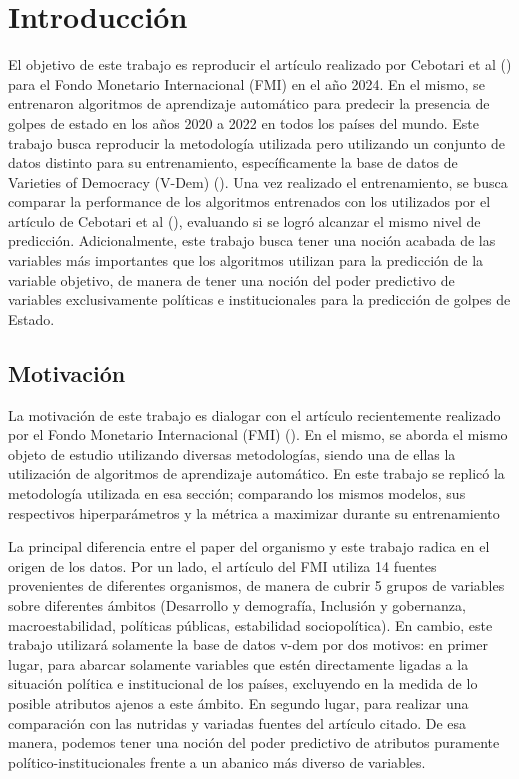 \documentclass{article}
\begin{document}

\pagebreak
\tableofcontents
\pagebreak

\section{Introducción}
El objetivo de este trabajo es reproducir el artículo realizado por Cebotari et al 
(\cite{Ceb24}) para el Fondo Monetario Internacional (FMI) en el año 2024. En el mismo,
se entrenaron algoritmos de aprendizaje automático para predecir la presencia de golpes
de estado en los años 2020 a 2022 en todos los países del mundo. Este trabajo busca
reproducir la metodología utilizada pero utilizando un conjunto de datos distinto para su
entrenamiento, específicamente la base de datos de Varieties of Democracy (V-Dem) 
(\cite{Cop24}). Una vez realizado el entrenamiento, se 
busca comparar la performance de los algoritmos entrenados con los utilizados por el artículo
de Cebotari et al (\cite{Ceb24}), evaluando si se logró alcanzar el mismo nivel de predicción. 
Adicionalmente, este trabajo busca tener una noción acabada de las variables más importantes 
que los algoritmos utilizan para la predicción de la variable objetivo, de manera de tener
una noción del poder predictivo de variables exclusivamente políticas e institucionales para 
la predicción de golpes de Estado.

\subsection{Motivación}
La motivación de este trabajo es dialogar con el artículo recientemente realizado por el 
Fondo Monetario Internacional (FMI) (\cite{Ceb24}). En el mismo, se aborda el mismo objeto 
de estudio utilizando diversas metodologías, siendo una de ellas la utilización de 
algoritmos de aprendizaje automático. En este trabajo se replicó la metodología utilizada 
en esa sección; comparando los mismos modelos, sus respectivos hiperparámetros y la 
métrica a maximizar durante su entrenamiento

La principal diferencia entre el paper del organismo y este trabajo radica en el origen
de los datos. Por un lado, el artículo del FMI utiliza 14 fuentes provenientes de 
diferentes organismos, de manera de cubrir 5 grupos de variables sobre diferentes ámbitos 
(Desarrollo y demografía, Inclusión y gobernanza, macroestabilidad, políticas públicas, 
estabilidad sociopolítica). En cambio, este trabajo utilizará solamente la base de datos 
v-dem por dos motivos: en primer lugar, para abarcar solamente variables que estén 
directamente ligadas a la situación política e institucional de los países, excluyendo en 
la medida de lo posible atributos ajenos a este ámbito. En segundo lugar, para realizar 
una comparación con las nutridas y variadas fuentes del artículo citado. De esa manera, 
podemos tener una noción del poder predictivo de atributos puramente 
político-institucionales frente a un abanico más diverso de variables.
\end{document}
